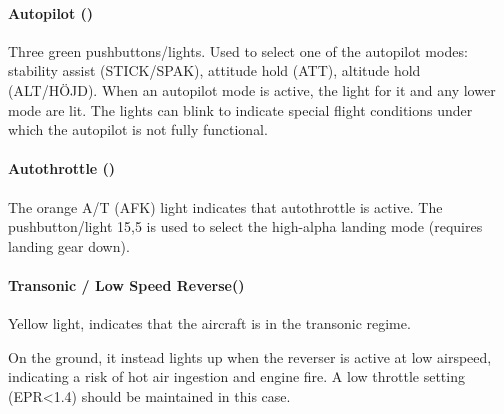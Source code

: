 \documentclass[a4paper]{report}
\begin{document}
\paragraph{Autopilot ()}
Three green pushbuttons/lights.
Used to select one of the autopilot modes: stability assist (STICK/SPAK),
attitude hold (ATT), altitude hold (ALT/HÖJD).
When an autopilot mode is active, the light for it and any lower mode are lit.
The lights can blink to indicate special flight conditions under which the
autopilot is not fully functional.

\paragraph{Autothrottle ()}
The orange A/T (AFK) light indicates that autothrottle is active.
The pushbutton/light 15,5\textdegree{} is used to select the high-alpha landing mode
(requires landing gear down).

\paragraph{Transonic / Low Speed Reverse()}
Yellow light, indicates that the aircraft is in the transonic regime.

On the ground, it instead lights up when the reverser is active at low airspeed,
indicating a risk of hot air ingestion and engine fire.
A low throttle setting (EPR<1.4) should be maintained in this case.

\end{document}
